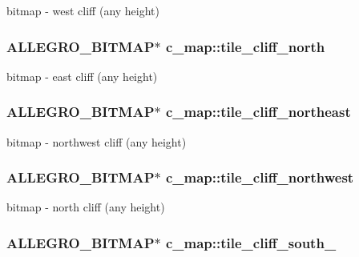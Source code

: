 bitmap -\/ west cliff (any height) \hypertarget{classc__map_aa8892af60c621c949f8f46485bd6f8b8}{
\subsubsection[{tile\-\_\-cliff\-\_\-north}]{\setlength{\rightskip}{0pt plus 5cm}A\-L\-L\-E\-G\-R\-O\-\_\-\-B\-I\-T\-M\-A\-P$\ast$ c\-\_\-map\-::tile\-\_\-cliff\-\_\-north\hspace{0.3cm}{\ttfamily [protected]}}}\label{classc__map_aa8892af60c621c949f8f46485bd6f8b8}
bitmap -\/ east cliff (any height) \hypertarget{classc__map_a1dd3e087030dad02e1329416daaf58bc}{
\subsubsection[{tile\-\_\-cliff\-\_\-northeast}]{\setlength{\rightskip}{0pt plus 5cm}A\-L\-L\-E\-G\-R\-O\-\_\-\-B\-I\-T\-M\-A\-P$\ast$ c\-\_\-map\-::tile\-\_\-cliff\-\_\-northeast\hspace{0.3cm}{\ttfamily [protected]}}}\label{classc__map_a1dd3e087030dad02e1329416daaf58bc}
bitmap -\/ northwest cliff (any height) \hypertarget{classc__map_aec73bf9c12354078037cc6d1b4de6025}{
\subsubsection[{tile\-\_\-cliff\-\_\-northwest}]{\setlength{\rightskip}{0pt plus 5cm}A\-L\-L\-E\-G\-R\-O\-\_\-\-B\-I\-T\-M\-A\-P$\ast$ c\-\_\-map\-::tile\-\_\-cliff\-\_\-northwest\hspace{0.3cm}{\ttfamily [protected]}}}\label{classc__map_aec73bf9c12354078037cc6d1b4de6025}
bitmap -\/ north cliff (any height) \hypertarget{classc__map_ab84679456c3df51222049c4fb80d66a9}{
\subsubsection[{tile\-\_\-cliff\-\_\-south\-\_\-1}]{\setlength{\rightskip}{0pt plus 5cm}A\-L\-L\-E\-G\-R\-O\-\_\-\-B\-I\-T\-M\-A\-P$\ast$ c\-\_\-map\-::tile\-\_\-cliff\-\_\-south\-\_\hspace{0.3cm}{\ttfamily [protected]}}}\label{classc__map_ab84679456c3df51222049c4fb80d66a9}
